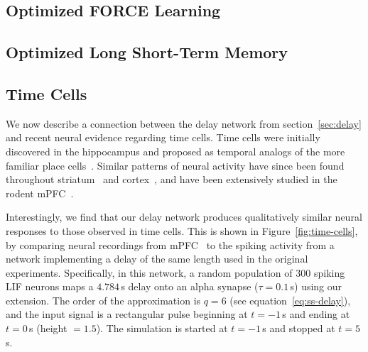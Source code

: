 \subsection{Optimized FORCE Learning}
\label{sec:force-comparison}



\subsection{Optimized Long Short-Term Memory}
\label{sec:delay-lstm}

\subsection{Time Cells}
\label{sec:time-cells}

We now describe a connection between the delay network from section~\ref{sec:delay} and recent neural evidence regarding time cells.
Time cells were initially discovered in the hippocampus and proposed as temporal analogs of the more familiar place cells~\citep{eichenbaum2014}.
Similar patterns of neural activity have since been found throughout striatum~\citep{mello2015scalable} and cortex~\citep{luczak2015packet}, and have been extensively studied in the rodent mPFC~\citep{kim2013neural, tiganj2016sequential}.

Interestingly, we find that our delay network produces qualitatively similar neural responses to those observed in time cells.
This is shown in Figure~\ref{fig:time-cells}, by comparing neural recordings from mPFC~\citep[][Figure~4~C,D]{tiganj2016sequential} to the spiking activity from a network implementing a delay of the same length used in the original experiments.
Specifically, in this network, a random population of $300$ spiking LIF neurons maps a $4.784$\,s delay onto an alpha synapse ($\tau = 0.1$\,s) using our extension.
The order of the approximation is $q = 6$ (see equation~\ref{eq:ss-delay}), and the input signal is a rectangular pulse beginning at $t = -1$\,s and ending at $t = 0$\,s (height $= 1.5$).
The simulation is started at $t = -1$\,s and stopped at $t = 5$\,s.


